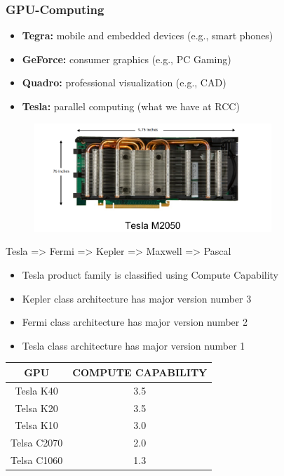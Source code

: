 \documentclass[xcolor={x11names,svgnames,dvipsnames}]{beamer}
\begin{document}
\begin{frame}
\frametitle{GPU-Computing}
\begin{itemize}
 \item \textbf{Tegra:}
 mobile and embedded devices (e.g., smart phones)
 \item \textbf{GeForce:} consumer graphics (e.g., PC Gaming)
 \item \textbf{Quadro:} professional visualization (e.g., CAD)
 \item \textbf{Tesla:}
 parallel computing (what we have at RCC)
\end{itemize}
 \begin{figure}
     \includegraphics[width=0.8\textwidth, height=0.4\textheight]{tesla.png}
\end{figure}
\centering
{Tesla => Fermi => Kepler => Maxwell => Pascal
}

\end{frame}

\begin{frame}
\begin{itemize}
\item Tesla product family is classified using Compute Capability
\item Kepler class architecture has major version number 3
\item Fermi class architecture has major version number 2

\item Tesla class architecture has major version number 1
\end{itemize}
\begin{center}
\begin{tabular}{|c|c|}
\hline GPU & COMPUTE CAPABILITY \\ 
\hline Tesla K40  &  3.5\\ 
\hline Telsa K20 &  3.5\\ 
\hline  Telsa K10&  3.0\\ 
\hline  Telsa C2070&  2.0\\ 
\hline  Telsa C1060&  1.3\\ 
\hline 
\end{tabular}
\end{center}
\end{frame}
\end{document}
